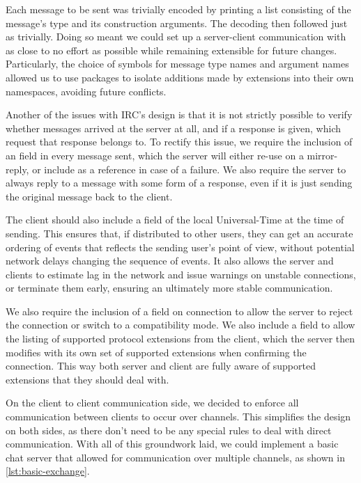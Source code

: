 \documentclass[format=sigconf]{acmart}
\begin{document}
Each message to be sent was trivially encoded by printing a list consisting of the message's type and its construction arguments. The decoding then followed just as trivially. Doing so meant we could set up a server-client communication with as close to no effort as possible while remaining extensible for future changes. Particularly, the choice of symbols for message type names and argument names allowed us to use packages to isolate additions made by extensions into their own namespaces, avoiding future conflicts.

Another of the issues with IRC's design is that it is not strictly possible to verify whether messages arrived at the server at all, and if a response is given, which request that response belongs to. To rectify this issue, we require the inclusion of an  field in every message sent, which the server will either re-use on a mirror-reply, or include as a reference in case of a failure. We also require the server to always reply to a message with some form of a response, even if it is just sending the original message back to the client.

The client should also include a  field of the local Universal-Time at the time of sending. This ensures that, if distributed to other users, they can get an accurate ordering of events that reflects the sending user's point of view, without potential network delays changing the sequence of events. It also allows the server and clients to estimate lag in the network and issue warnings on unstable connections, or terminate them early, ensuring an ultimately more stable communication.

We also require the inclusion of a  field on connection to allow the server to reject the connection or switch to a compatibility mode. We also include a  field to allow the listing of supported protocol extensions from the client, which the server then modifies with its own set of supported extensions when confirming the connection. This way both server and client are fully aware of supported extensions that they should deal with.

On the client to client communication side, we decided to enforce all communication between clients to occur over channels. This simplifies the design on both sides, as there don't need to be any special rules to deal with direct communication. With all of this groundwork laid, we could implement a basic chat server that allowed for communication over multiple channels, as shown in \autoref{lst:basic-exchange}.
\end{document}
